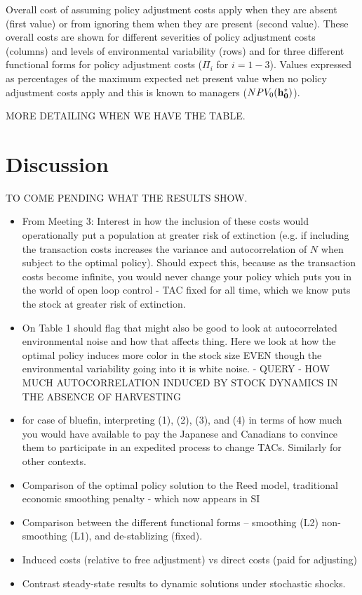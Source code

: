 \documentclass{article}\usepackage{graphicx, color}
\begin{document}
\begin{table}[ht]
\caption{Overall cost of assuming policy adjustment costs apply when they are absent (first value) or from ignoring them when they are present (second value). These overall costs are shown for different severities of policy adjustment costs (columns) and levels of environmental variability (rows) and for three different functional forms for policy adjustment costs ($\Pi_i$ for $ i=1-3$). Values expressed as percentages of the maximum expected net present value when no policy adjustment costs apply and this is known to managers ($ NPV_0 ({\bf h_0^*}) $). }
\end{table}

MORE DETAILING WHEN WE HAVE THE TABLE.

\section{Discussion}
TO COME PENDING WHAT THE RESULTS SHOW.
\begin{itemize}
\item From Meeting 3: Interest in how the inclusion of these costs would operationally put a population at greater risk of extinction (e.g. if including the transaction costs increases the variance and autocorrelation of $N$ when subject to the optimal policy). Should expect this, because as the transaction costs become infinite, you would never change your policy which puts you in the world of open loop control - TAC fixed for all time, which we know puts the stock at greater risk of extinction.
\item On Table 1 should flag that might also be good to look at autocorrelated environmental noise and how that affects thing. Here we look at how the optimal policy induces more color in the stock size EVEN though the environmental variability going into it is white noise. - QUERY - HOW MUCH AUTOCORRELATION INDUCED BY STOCK DYNAMICS IN THE ABSENCE OF HARVESTING
\item for case of bluefin, interpreting  (1), (2), (3), and (4) in terms of how much you would have available to pay the Japanese and Canadians to convince them to participate in an expedited process to change TACs. Similarly for other contexts.
\item   Comparison of the optimal policy solution to the Reed model, traditional economic smoothing penalty - which now appears in SI
\item  Comparison between the different functional forms -- smoothing (L2)
  non-smoothing (L1), and de-stablizing (fixed).
\item   Induced costs (relative to free adjustment) vs direct costs (paid for adjusting) 
\item   Contrast steady-state results to dynamic solutions under stochastic shocks.
\end{itemize}
\end{document}
